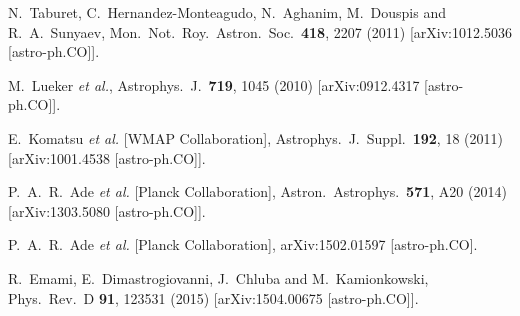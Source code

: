 \documentclass[aps,twocolumn,floats,prd,nofootinbib,10pt,floatfix]{revtex4-1}
\begin{document}
\begin{thebibliography}{99}
  N.~Taburet, C.~Hernandez-Monteagudo, N.~Aghanim, M.~Douspis and R.~A.~Sunyaev,
  Mon.\ Not.\ Roy.\ Astron.\ Soc.\  {\bf 418}, 2207 (2011)
  [arXiv:1012.5036 [astro-ph.CO]].


  M.~Lueker {\it et al.},
  Astrophys.\ J.\  {\bf 719}, 1045 (2010)
  [arXiv:0912.4317 [astro-ph.CO]].


  E.~Komatsu {\it et al.} [WMAP Collaboration],
  Astrophys.\ J.\ Suppl.\  {\bf 192}, 18 (2011)
  [arXiv:1001.4538 [astro-ph.CO]].


  P.~A.~R.~Ade {\it et al.} [Planck Collaboration],
  Astron.\ Astrophys.\  {\bf 571}, A20 (2014)
  [arXiv:1303.5080 [astro-ph.CO]].


  P.~A.~R.~Ade {\it et al.} [Planck Collaboration],
  arXiv:1502.01597 [astro-ph.CO].


  R.~Emami, E.~Dimastrogiovanni, J.~Chluba and M.~Kamionkowski,
  Phys.\ Rev.\ D {\bf 91}, 123531 (2015)
  [arXiv:1504.00675 [astro-ph.CO]].



\end{thebibliography}
\end{document}
